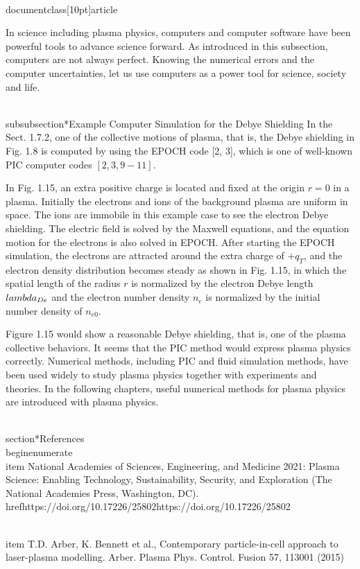 \\documentclass[10pt]{article}
\begin{document}
In science including plasma physics, computers and computer software have been powerful tools to advance science forward. As introduced in this subsection, computers are not always perfect. Knowing the numerical errors and the computer uncertainties, let us use computers as a power tool for science, society and life.

\\subsubsection*{Example Computer Simulation for the Debye Shielding}
In the Sect. 1.7.2, one of the collective motions of plasma, that is, the Debye shielding in Fig. 1.8 is computed by using the EPOCH code [2, 3], which is one of well-known PIC computer codes $[2,3,9-11]$.

In Fig. 1.15, an extra positive charge is located and fixed at the origin $r=0$ in a plasma. Initially the electrons and ions of the background plasma are uniform in space. The ions are immobile in this example case to see the electron Debye shielding. The electric field is solved by the Maxwell equations, and the equation motion for the electrons is also solved in EPOCH. After starting the EPOCH simulation, the electrons are attracted around the extra charge of $+q_{T}$, and the electron density distribution becomes steady as shown in Fig. 1.15, in which the spatial length of the radius $r$ is normalized by the electron Debye length $\\lambda_{D e}$ and the electron number density $n_{e}$ is normalized by the initial number density of $n_{e 0}$.

Figure 1.15 would show a reasonable Debye shielding, that is, one of the plasma collective behaviors. It seems that the PIC method would express plasma physics correctly. Numerical methods, including PIC and fluid simulation methods, have
been used widely to study plasma physics together with experiments and theories. In the following chapters, useful numerical methods for plasma physics are introduced with plasma physics.

\\section*{References}
\\begin{enumerate}
  \\item National Academies of Sciences, Engineering, and Medicine 2021: Plasma Science: Enabling Technology, Sustainability, Security, and Exploration (The National Academies Press, Washington, DC). \\href{https://doi.org/10.17226/25802}{https://doi.org/10.17226/25802}

  \\item T.D. Arber, K. Bennett et al., Contemporary particle-in-cell approach to laser-plasma modelling. Arber. Plasma Phys. Control. Fusion 57, 113001 (2015)
\end{document}
